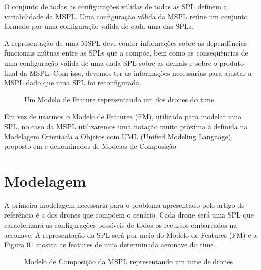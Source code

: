 \documentclass[12pt,oneside, a4paper]{article}
\begin{document}
O conjunto de todas as configurações válidas de todas as SPL definem a variabilidade da MSPL. Uma configuração válida da MSPL reúne um conjunto formado por uma configuração válida de cada uma das SPLs.

A representação de uma MSPL deve conter informações sobre as dependências funcionais mútuas entre as SPLs que a compõe, bem como as consequências de uma configuração válida de uma dada SPL sobre as demais e sobre o produto final da MSPL. Com isso, devemos ter as informações necessárias para ajustar a MSPL dado que uma SPL foi reconfigurada.

\begin{figure}[!htb]
\centering
{}
\caption{Um Modelo de Feature representando um dos drones do time}
\label{figure 01}
\end{figure}

Em vez de usarmos o Modelo de Features (FM), utilizado para modelar uma SPL,  no caso da MSPL utilizaremos uma notação muito próxima à definida na Modelagem Orientada a Objetos com UML (Unified Modeling Language), proposto em \cite[Rosenmüller, 2018]{02} e denominados de Modelos de Composição.


\section{Modelagem}

A primeira modelagem necessária para o problema apresentado pelo artigo de referência \cite{01} é a dos drones que compõem o cenário. Cada drone será uma SPL que caracterízará as configurações possíveis de todos os recursos embarcados na aeronave. A representação da SPL será por meio do Modelo de Features (FM) e a Figura 01 mostra as features de uma determinada aeronave do time.

\begin{figure}[!htb]
\centering
{}
\caption{Modelo de Composição da MSPL representando um time de drones}
\label{figure 02}
\end{figure}
\end{document}
